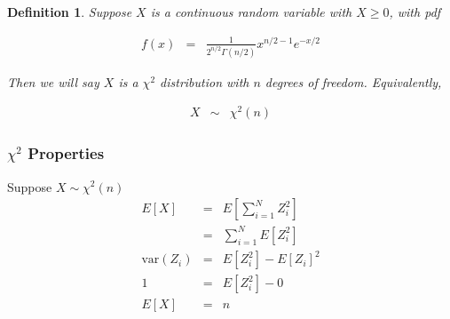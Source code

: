 \documentclass{beamer}
\newtheorem{defn}{Definition}
\numberwithin{equation}{section}
\begin{document}
\begin{frame}

\begin{defn}
Suppose $X$ is a continuous random variable with $X\geq 0$, with pdf 

\begin{eqnarray}
f(x) & = & \frac{1}{2^{n/2} \Gamma(n/2) } x^{n/2 - 1} e^{-x/2} \nonumber 
\end{eqnarray}

Then we will say $X$ is a $\chi^2$ distribution with $n$ degrees of freedom.  Equivalently,

\begin{eqnarray}
X & \sim & \chi^{2}(n) \nonumber 
\end{eqnarray}

\end{defn}



\end{frame}


\begin{frame}



\end{frame}


\begin{frame}
\frametitle{$\chi^2$ Properties}

Suppose $X \sim \chi^2(n)$
\begin{eqnarray}
E[X] & = & E\left[\sum_{i=1}^{N} Z_{i}^2\right] \nonumber \\
 & = & \sum_{i=1}^{N} E[Z_{i}^{2} ] \nonumber \\
\text{var}(Z_{i} ) & = & E[Z_{i}^2] - E[Z_{i}]^2 \nonumber\\
1 & = & E[Z_{i}^2]- 0 \nonumber \\
E[X] & = & n \nonumber 
 \end{eqnarray}



\end{frame}
\end{document}
